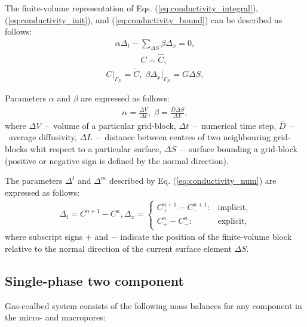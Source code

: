 \documentclass[a4paper,14pt,english]{extreport}
\begin{document}
The finite-volume representation of Eqs. (\ref{eq:conductivity_integral}), (\ref{eq:conductivity_init}), and (\ref{eq:conductivity_bound}) can be described as follows:
    \begin{eqnarray}
        \label{eq:conductivity_num}
        \alpha \Delta_{t} - \sum_{\Delta S} \beta\Delta_{x}= 0,
    \end{eqnarray}
    \begin{eqnarray}
         \label{eq:eq:conductivity_init_num}
        C = \hat{C}, \; 
    \end{eqnarray}
    \begin{eqnarray}
    \label{eq:eq:conductivity_bound_num}
      \label{eq:conductivity_bound_num}
    C \Big|_{\mathit{\Gamma}_D}= \tilde{C}, \; \beta\Delta_x \Big|_{\mathit{\Gamma}_N} = G\Delta S,
    \end{eqnarray}

Parameters $\alpha$ and $\beta$ are expressed as follows:
    \begin{eqnarray}
        \label{eq:alpha_beta}
        \alpha = \frac{\Delta V}{\Delta t}, \;
        \beta= \frac{\overline{D} \Delta S}{\Delta L},
    \end{eqnarray}
where $\Delta V$~--~volume of a particular grid-block, $\Delta t$~--~numerical time step, $\overline{D}$~--~average diffusivity, $\Delta L$~--~distance between centres of two neighbouring grid-blocks whit respect to a particular surface, $\Delta S$~--~surface bounding a grid-block (positive or negative sign is defined by the normal direction).

The parameters $\Delta^{t}$ and $\Delta^{m}$ described by Eq. (\ref{eq:conductivity_num}) are expressed as follows:
    \begin{eqnarray}
    \label{eq:delta_num}
    \Delta_t = C^{n+1} - C^{n}, \Delta_x = \begin{cases}
    C_{+}^{n+\mathit1} - C_{-}^{n+\mathit1} : &\text{implicit},\\
        C_{+}^{n} - C_{-}^{n} : &\text{explicit},
    \end{cases}
    \end{eqnarray}
where subscript signs $+$ and $-$ indicate the position of the finite-volume block relative to the normal direction of the current surface element $\Delta S$.

 \subsection*{Single-phase two component}
 Gas-coalbed system consists of the following mass balances for any component in the micro- and macropores:
 
\end{document}
